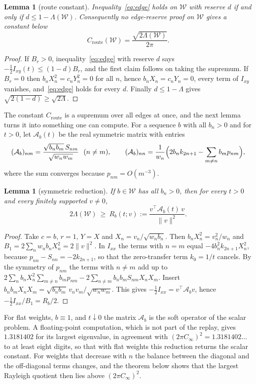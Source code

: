 \documentclass[10pt]{article}
\newtheorem{lemma}[theorem]{Lemma}
\theoremstyle{remark}
\newcommand{\Cinf}{C_\infty}
\newcommand{\Croute}{C_{\mathrm{route}}}
\begin{document}
\begin{lemma}[route constant]\label{lem:route}
Inequality~\eqref{eq:edge} holds on $\mathcal W$ with reserve $d$ if and only if $d\le1-\Lambda(\mathcal W)$. Consequently no edge-reserve proof on $\mathcal W$ gives a constant below
\[
\Croute(\mathcal W)=\frac{\sqrt{2\Lambda(\mathcal W)}}{2\pi}.
\]
\end{lemma}

\begin{proof}
If $B_r>0$, inequality~\eqref{eq:edge} with reserve $d$ says $-\frac12I_{xy}(t)\le(1-d)B_r$, and the first claim follows on taking the supremum. If $B_r=0$ then $b_nX_n^2=c_nY_n^2=0$ for all $n$, hence $b_nX_n=c_nY_n=0$, every term of $I_{xy}$ vanishes, and~\eqref{eq:edge} holds for every $d$. Finally $d\le1-\Lambda$ gives $\sqrt{2(1-d)}\ge\sqrt{2\Lambda}$.
\end{proof}

The constant $\Croute$ is a supremum over all edges at once, and the next lemma turns it into something one can compute. For a sequence $b$ with all $b_n>0$ and for $t>0$, let $\mathcal A_b(t)$ be the real symmetric matrix with entries
\[
(\mathcal A_b)_{nm}=\frac{\sqrt{b_nb_m}\,S_{nm}}{\sqrt{w_nw_m}}\ \ (n\ne m),\qquad
(\mathcal A_b)_{nn}=\frac1{w_n}\Bigl(2b_nk_{2n+1}-\sum_{m\ne n}b_mp_{nm}\Bigr),
\]
where the sum converges because $p_{nm}=O(m^{-3})$.

\begin{lemma}[symmetric reduction]\label{lem:sym}
If $b\in\mathcal W$ has all $b_n>0$, then for every $t>0$ and every finitely supported $v\ne0$,
\[
2\Lambda(\mathcal W)\ \ge\ R_b(t;v):=\frac{v^{\top}\mathcal A_b(t)\,v}{\|v\|^2}.
\]
\end{lemma}

\begin{proof}
Take $c=b$, $r=1$, $Y=X$ and $X_n=v_n/\sqrt{w_nb_n}$. Then $b_nX_n^2=v_n^2/w_n$ and $B_1=2\sum_nw_nb_nX_n^2=2\|v\|^2$. In $I_{xx}$ the terms with $n=m$ equal $-4b_n^2k_{2n+1}X_n^2$, because $p_{nn}-S_{nn}=-2k_{2n+1}$, so that the zero-transfer term $k_0=1/t$ cancels. By the symmetry of $p_{nm}$ the terms with $n\ne m$ add up to $2\sum_nb_nX_n^2\sum_{m\ne n}b_mp_{nm}-2\sum_{n\ne m}b_nb_mS_{nm}X_nX_m$. Insert $b_nb_mX_nX_m=\sqrt{b_nb_m}\,v_nv_m/\sqrt{w_nw_m}$. This gives $-\frac12I_{xx}=v^{\top}\mathcal A_bv$, hence $-\frac12I_{xx}/B_1=R_b/2$.
\end{proof}

For flat weights, $b\equiv1$, and $t\downarrow0$ the matrix $\mathcal A_b$ is the soft operator of the scalar problem. A floating-point computation, which is not part of the replay, gives $1.3181402$ for its largest eigenvalue, in agreement with $(2\pi\Cinf)^2=1.3181402\ldots$ to at least eight digits, so that with flat weights this reduction returns the scalar constant. For weights that decrease with $n$ the balance between the diagonal and the off-diagonal terms changes, and the theorem below shows that the largest Rayleigh quotient then lies above $(2\pi\Cinf)^2$.
\end{document}
